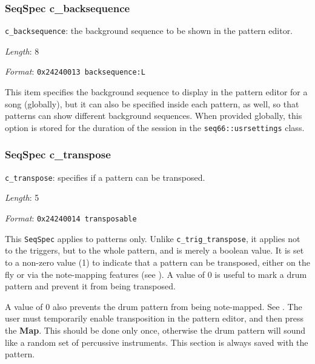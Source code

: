 \subsubsection{SeqSpec c\_backsequence}
\label{subsubsec:midi_format_track_seqspec_backsequence}

   \begin{description}
      \item \texttt{c\_backsequence}:
         the background sequence to be shown in the pattern editor.
      \item \textsl{Length}: 8
      \item \textsl{Format}: \texttt{0x24240013 backsequence:L}
   \end{description}

   This item specifies the background sequence to display in the pattern
   editor for a song (globally), but it
   can also be specified inside each pattern, as well, so that patterns
   can show different background sequences.
   When provided globally, this option is stored for the duration
   of the session in the
   \texttt{seq66::usrsettings} class.

\subsubsection{SeqSpec c\_transpose}
\label{subsubsec:midi_format_track_seqspec_transpose}

   \begin{description}
      \item \texttt{c\_transpose}: specifies if a pattern can be transposed.
      \item \textsl{Length}: 5
      \item \textsl{Format}: \texttt{0x24240014 transposable}
   \end{description}

   This
   \texttt{SeqSpec} applies to patterns only.
   Unlike \texttt{c\_trig\_transpose}, it applies not to the triggers, but
   to the whole pattern, and is merely a boolean value.
   It is set to a non-zero value (1) to indicate
   that a pattern can be transposed, either on the fly or via the
   note-mapping features (see ).
   A value of 0 is useful to mark a drum pattern and prevent it from being
   transposed.

   A value of 0 also prevents the drum pattern from being note-mapped.
   See .
   The user must temporarily enable transposition in the pattern editor, and
   then press the \textbf{Map}.  This should be done only once, otherwise the
   drum pattern will sound like a random set of percussive instruments.
   This section is always saved with the pattern.

